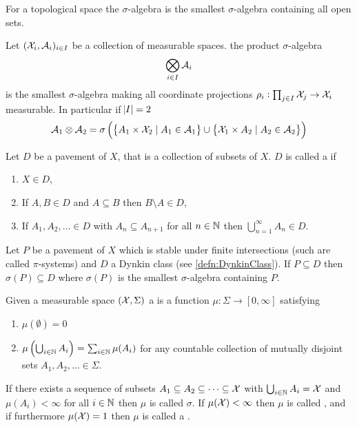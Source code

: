 \begin{defn}
  For a topological space the  $\sigma$-algebra is the smallest
  $\sigma$-algebra containing all open sets.
  \label{defn:BorelAlg}
\end{defn}

\begin{defn}
  Let $(\mathcal{X}_i, \mathcal{A}_i)_{i \in I}$ be a collection of measurable spaces.
  the product $\sigma$-algebra
  \[ \bigotimes_{i \in I} \mathcal{A}_i \]
  is the smallest $\sigma$-algebra making all coordinate projections
  $\rho_i : \prod_{j \in I} \mathcal{X}_j \to \mathcal{X}_i$
  measurable.
  In particular if $\abs{I} = 2$
  \[ \mathcal{A}_1 \otimes \mathcal{A}_2 = \sigma \left(
      \left\{ A_1 \times \mathcal{X}_2 \mid A_1 \in \mathcal{A}_1 \right\} \cup
  \left\{ \mathcal{X}_1 \times A_2 \mid A_2 \in \mathcal{A}_2 \right\} \right) \]
  \label{defn:prodSigmaAlg}
\end{defn}

\begin{defn}
  Let $D$ be a pavement of $X$,
  that is a collection of subsets of $X$.
  $D$ is called a  if
  \begin{enumerate}
    \item $X \in D$,
    \item If $A, B \in D$ and $A \subseteq B$ then $B \setminus A \in D$,
    \item If $A_1, A_2, \dots \in D$ with $A_n \subseteq A_{n+1}$ for
      all $n \in \mathbb{N}$ then $\bigcup_{n=1}^\infty A_n \in D$.
  \end{enumerate}
  \label{defn:DynkinClass}
\end{defn}

\begin{thm}
  Let $P$ be a pavement of $X$ which is stable under finite intersections
  (such are called $\pi$-systems) and $D$ a Dynkin class
  (see \cref{defn:DynkinClass}).
  If $P \subseteq D$ then $\sigma(P) \subseteq D$
  where $\sigma(P)$ is the smallest $\sigma$-algebra containing $P$.
  \label{thm:DynkinPiLambda}
\end{thm}

\begin{defn}[Measure]
  Given a measurable space $(\mathcal{X}, \Sigma)$ a 
  is a function $\mu : \Sigma \to [0, \infty]$ satisfying
  \begin{enumerate}
    \item $\mu(\emptyset) = 0$
    \item $\mu\left( \bigcup_{i \in \mathbb{N}} A_i \right) =
      \sum_{i \in \mathbb{N}} \mu(A_i)$
      for any countable collection of mutually disjoint sets
      $A_1, A_2, \dots \in \Sigma$.
  \end{enumerate}
  If there exists a sequence of subsets
  $A_1 \subseteq A_2 \subseteq \dots \subseteq
  \mathcal{X}$ with $\bigcup_{i \in \mathbb{N}} A_i = \mathcal{X}$ and $\mu(A_i) < \infty$ for all
  $i \in \mathbb{N}$ then $\mu$ is called $\sigma$.
  If $\mu(\mathcal{X}) < \infty$ then $\mu$ is called ,
  and if furthermore $\mu(\mathcal{X}) = 1$ then $\mu$ is called a
  .
\end{defn}

